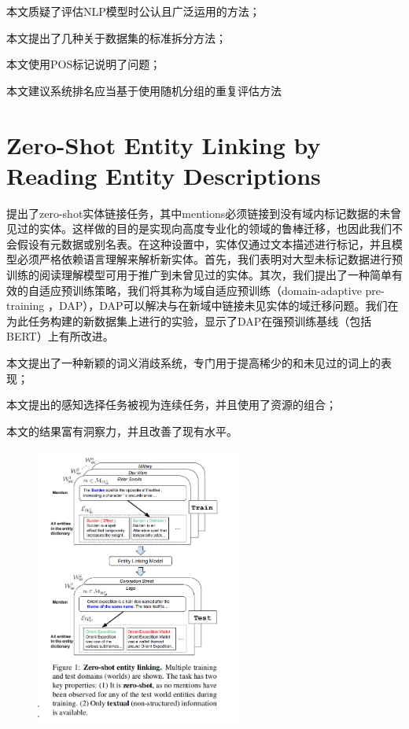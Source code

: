 \documentclass[a4paper,UTF8]{article}
\numberwithin{equation}{section}
\begin{document}
本文质疑了评估NLP模型时公认且广泛运用的方法；

本文提出了几种关于数据集的标准拆分方法；

本文使用POS标记说明了问题；

本文建议系统排名应当基于使用随机分组的重复评估方法


\newpage
\section{Zero-Shot Entity Linking by Reading Entity Descriptions}
提出了zero-shot实体链接任务，其中mentions必须链接到没有域内标记数据的未曾见过的实体。这样做的目的是实现向高度专业化的领域的鲁棒迁移，也因此我们不会假设有元数据或别名表。在这种设置中，实体仅通过文本描述进行标记，并且模型必须严格依赖语言理解来解析新实体。首先，我们表明对大型未标记数据进行预训练的阅读理解模型可用于推广到未曾见过的实体。其次，我们提出了一种简单有效的自适应预训练策略，我们将其称为域自适应预训练（domain-adaptive pre-training ，DAP），DAP可以解决与在新域中链接未见实体的域迁移问题。我们在为此任务构建的新数据集上进行的实验，显示了DAP在强预训练基线（包括BERT）上有所改进。

本文提出了一种新颖的词义消歧系统，专门用于提高稀少的和未见过的词上的表现；

本文提出的感知选择任务被视为连续任务，并且使用了资源的组合；

本文的结果富有洞察力，并且改善了现有水平。

\begin{figure}[H]
	\centering
	\includegraphics[width=0.6\textwidth]{8-1.png}
\end{figure}
\end{document}
